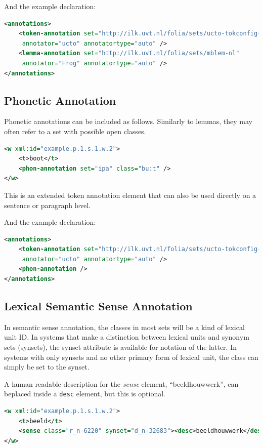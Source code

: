 \documentclass[a4paper,12pt]{report}
\begin{document}
And the example declaration:

\begin{lstlisting}[language=xml]
<annotations>
    <token-annotation set="http://ilk.uvt.nl/folia/sets/ucto-tokconfig-nl" 
     annotator="ucto" annotatortype="auto" />
    <lemma-annotation set="http://ilk.uvt.nl/folia/sets/mblem-nl"
     annotator="Frog" annotatortype="auto" />
</annotations>
\end{lstlisting}

\subsection{Phonetic Annotation}

Phonetic annotations can be included as follows. Similarly to lemmas, they may often refer to a set with possible open classes.

\begin{lstlisting}[language=xml]
<w xml:id="example.p.1.s.1.w.2">
    <t>boot</t>
    <phon-annotation set="ipa" class="bu:t" />
</w>
\end{lstlisting}

This is an extended token annotation element that can also be used directly on a sentence or paragraph level.

And the example declaration:

\begin{lstlisting}[language=xml]
<annotations>
    <token-annotation set="http://ilk.uvt.nl/folia/sets/ucto-tokconfig-nl" 
     annotator="ucto" annotatortype="auto" />
    <phon-annotation />
</annotations>
\end{lstlisting}

\subsection{Lexical Semantic Sense Annotation}

In semantic sense annotation, the classes in most sets will be a kind of lexical unit ID. In systems that make a distinction between lexical units and synonym sets (synsets), the synset attribute is available for notation of the latter. In systems with only synsets and no other primary form of lexical unit, the class can simply be set to the synset.

A human readable description for the \emph{sense} element, ``beeldhouwwerk'', can beplaced inside a \texttt{desc} element, but this is optional.

\begin{lstlisting}[language=xml]
<w xml:id="example.p.1.s.1.w.2">
    <t>beeld</t>
    <sense class="r_n-6220" synset="d_n-32683"><desc>beeldhouwwerk</desc></sense>
</w>
\end{lstlisting}
\end{document}
